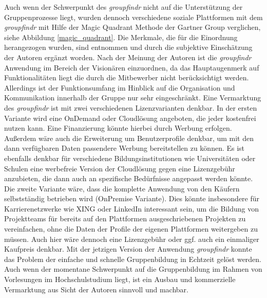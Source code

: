 Auch wenn der Schwerpunkt des \emph{groupfindr} nicht auf die Unterstützung der Gruppenprozesse liegt, wurden dennoch verschiedene soziale Plattformen mit dem \emph{groupfindr} mit Hilfe der Magic Quadrant Methode der Gartner Group \citet{magic_quadrant} verglichen, siehe Abbildung \ref{magic_quadrant}.  Die Merkmale, die für die Einordnung herangezogen wurden, sind \citet{gruppen-bildung} entnommen und durch die subjektive Einschätzung der Autoren ergänzt worden. Nach der Meinung der Autoren ist die \emph{groupfindr} Anwendung im Bereich der Visionären einzuordnen, da das Hauptaugenmerk auf Funktionalitäten liegt die durch die Mitbewerber nicht berücksichtigt werden. Allerdings ist der Funktionsumfang im Hinblick auf die Organisation und Kommunikation innerhalb der Gruppe nur sehr eingeschränkt.
\newline\newline
Eine Vermarktung des \emph{groupfindr} ist mit zwei verschiedenen Lizenzvarianten denkbar. In der ersten Variante wird eine OnDemand oder Cloudlösung angeboten, die jeder kostenfrei nutzen kann. Eine Finanzierung könnte hierbei durch Werbung erfolgen. Außerdem wäre auch die Erweiterung um Benutzerprofile denkbar, um mit den dann verfügbaren Daten passendere Werbung bereitstellen zu können. Es ist ebenfalls denkbar für verschiedene Bildungsinstitutionen wie Universitäten oder Schulen eine werbefreie Version der Cloudlösung gegen eine Lizenzgebühr anzubieten, die dann auch an spezifische Bedürfnisse angepasst werden könnte. Die zweite Variante wäre, dass die komplette Anwendung von den Käufern selbstständig betrieben wird (OnPremise Variante). Dies könnte insbesondere für Karrierenetzwerke wie XING oder LinkedIn interessant sein, um die Bildung von Projektteams für bereits auf den Plattformen ausgeschriebenen Projekten zu vereinfachen, ohne die Daten der Profile der eigenen Plattformen weitergeben zu müssen. Auch hier wäre dennoch eine Lizenzgebühr oder ggf. auch ein einmaliger Kaufpreis denkbar.
\newline\newline
Mit der jetzigen Version der Anwendung \emph{groupfindr} konnte das Problem der einfache und schnelle Gruppenbildung in Echtzeit gelöst werden. Auch wenn der momentane Schwerpunkt auf die Gruppenbildung im Rahmen von Vorlesungen im Hochschulstudium liegt, ist ein Ausbau und kommerzielle Vermarktung aus Sicht der Autoren sinnvoll und machbar.
